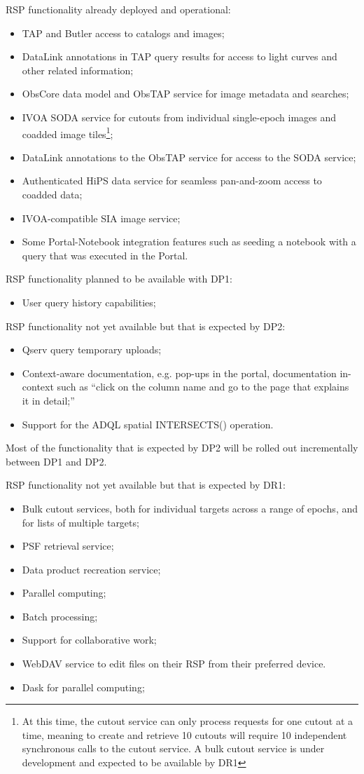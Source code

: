 RSP functionality already deployed and operational:
\begin{itemize}
\item TAP and Butler access to catalogs and images;
\item DataLink annotations in TAP query results for access to light curves and other related information;
\item ObsCore data model and ObsTAP service for image metadata and searches;
\item IVOA SODA service for cutouts from individual single-epoch images and coadded image tiles\footnote{At this time, the cutout service can only process requests for one cutout at a time, meaning to create and retrieve 10 cutouts will require 10 independent synchronous calls to the cutout service. A bulk cutout service is under development and expected to be available by DR1};
\item DataLink annotations to the ObsTAP service for access to the SODA service;
\item Authenticated HiPS data service for seamless pan-and-zoom access to coadded data;
\item IVOA-compatible SIA image service;
\item Some Portal-Notebook integration features such as  seeding a notebook with a query that was executed in the Portal.
\end{itemize}

RSP functionality planned to be available with  DP1: 
\begin{itemize}
\item User query history capabilities;
\end{itemize}

RSP functionality not yet available but that is expected by DP2:
\begin{itemize}
\item Qserv query temporary uploads;
\item Context-aware documentation, e.g. pop-ups in the portal, documentation in-context such as  ``click on the column name and go to the page that explains it in detail;''
\item Support for the ADQL  spatial INTERSECTS() operation.
\end{itemize}
Most of the functionality  that is expected by DP2 will be rolled out incrementally between DP1 and DP2.

RSP functionality not yet available but that is expected by DR1:
\begin{itemize}
\item Bulk cutout services, both for individual targets across a range of epochs, and for lists of multiple targets;
\item PSF retrieval service;
\item Data product recreation service; 
\item Parallel computing;
\item Batch processing; 
\item Support for collaborative work;
\item WebDAV service to edit files on their RSP from their preferred device. 
\item Dask for parallel computing;
\end{itemize} 

